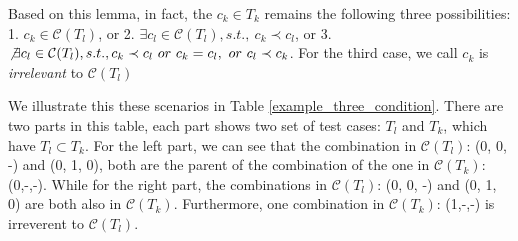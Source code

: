 \documentclass{sig-alternate}
\begin{document}
Based on this lemma, in fact, the $c_{k} \in T_{k}$  remains the following three possibilities: 1. $c_{k} \in \mathcal{C}(T_{l})$, or 2. $\exists c_{l} \in \mathcal{C}(T_{l}), s.t.,\ c_{k} \prec c_{l}$, or 3. $\not\exists c_{l} \in \mathcal{C}(T_{l}), s.t., c_{k} \prec c_{l}\ or\ c_{k} = c_{l},\ or\ c_{l} \prec c_{k}$. For the third case, we call $c_{k}$ is \emph{irrelevant} to $\mathcal{C}(T_{l})$

We illustrate this these scenarios in Table \ref{example_three_condition}. There are two parts in this table, each part shows two set of test cases: $T_{l}$ and $T_{k}$, which have $T_{l} \subset T_{k}$. For the left part, we can see that the combination in $\mathcal{C}(T_{l})$: (0, 0, -) and (0, 1, 0), both are the parent of the combination of the one in $\mathcal{C}(T_{k})$:(0,-,-). While for the right part, the combinations in $\mathcal{C}(T_{l})$: (0, 0, -) and (0, 1, 0) are both also in $\mathcal{C}(T_{k})$. Furthermore, one combination in $\mathcal{C}(T_{k})$: (1,-,-) is irreverent to $\mathcal{C}(T_{l})$.


%
\end{document}
